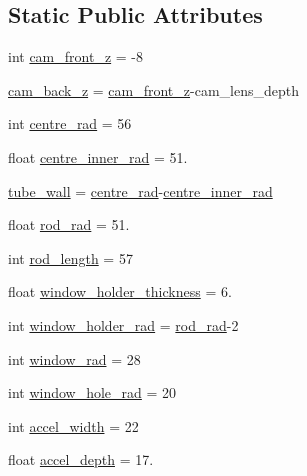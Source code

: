 \subsection*{Static Public Attributes}
\begin{DoxyCompactItemize}
\item 
int \hyperlink{classboxes_1_1_thermal_turret_a7d43a7aee8813859340e72f8f885425d}{cam\+\_\+front\+\_\+z} = -\/8
\item 
\hyperlink{classboxes_1_1_thermal_turret_ae661f068d7a528bd63faf91871bdb3fb}{cam\+\_\+back\+\_\+z} = \hyperlink{classboxes_1_1_thermal_turret_a7d43a7aee8813859340e72f8f885425d}{cam\+\_\+front\+\_\+z}-\/cam\+\_\+lens\+\_\+depth
\item 
int \hyperlink{classboxes_1_1_thermal_turret_a5c59e160df5140c8c75f60bb38a67e53}{centre\+\_\+rad} = 56
\item 
float \hyperlink{classboxes_1_1_thermal_turret_a36b76143cdf4df55cabf319ffac90770}{centre\+\_\+inner\+\_\+rad} = 51.
\item 
\hyperlink{classboxes_1_1_thermal_turret_a2e661e57f0edb505bba19f7b4448746b}{tube\+\_\+wall} = \hyperlink{classboxes_1_1_thermal_turret_a5c59e160df5140c8c75f60bb38a67e53}{centre\+\_\+rad}-\/\hyperlink{classboxes_1_1_thermal_turret_a36b76143cdf4df55cabf319ffac90770}{centre\+\_\+inner\+\_\+rad}
\item 
float \hyperlink{classboxes_1_1_thermal_turret_a078053e29ed936247e167e380726b3a5}{rod\+\_\+rad} = 51.
\item 
int \hyperlink{classboxes_1_1_thermal_turret_ab638dbd5aef255277401150a92f53919}{rod\+\_\+length} = 57
\item 
float \hyperlink{classboxes_1_1_thermal_turret_a0dd4d0cb1a67fdf730678ae529907b06}{window\+\_\+holder\+\_\+thickness} = 6.
\item 
int \hyperlink{classboxes_1_1_thermal_turret_af32d01022aa50258191fa93abfd79d34}{window\+\_\+holder\+\_\+rad} = \hyperlink{classboxes_1_1_thermal_turret_a078053e29ed936247e167e380726b3a5}{rod\+\_\+rad}-\/2
\item 
int \hyperlink{classboxes_1_1_thermal_turret_a95d0367c1f976db346546a5bfa66de19}{window\+\_\+rad} = 28
\item 
int \hyperlink{classboxes_1_1_thermal_turret_a7700fadf35f25068cf68c73c2bdbbcc7}{window\+\_\+hole\+\_\+rad} = 20
\item 
int \hyperlink{classboxes_1_1_thermal_turret_a7bcdff7fb33674f0789854c382ce877f}{accel\+\_\+width} = 22
\item 
float \hyperlink{classboxes_1_1_thermal_turret_a43c3ebccf10ab0d89ffe5c4830b07a4c}{accel\+\_\+depth} = 17.

\end{DoxyCompactItemize}
